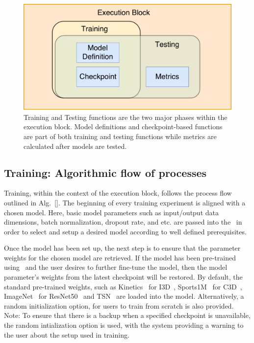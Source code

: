 \documentclass{llncs}
\begin{document}
\begin{figure}[t!]
\centering
\includegraphics[width=0.8\columnwidth]{images/exec_block.pdf}
\caption{Training and Testing functions are the two major phases within the execution block. Model definitions and checkpoint-based functions are part of both training and testing functions while metrics are calculated after models are tested.}
\label{fig:exec_block}
\end{figure}

\subsection{Training: Algorithmic flow of processes}
\label{sec:training}
Training, within the context of the execution block, follows the process flow outlined in Alg.~\ref{}.
The beginning of every training experiment is aligned with a chosen model. 
Here, basic model parameters such as input/output data dimensions, batch normalization, dropout rate, and etc. are passed into the \model~in order to select and setup a desired model according to well defined prerequisites.

Once the model has been set up, the next step is to ensure that the parameter weights for the chosen model are retrieved. 
If the model has been pre-trained using \acro~and the user desires to further fine-tune the model, then the model parameter's weights from the latest checkpoint will be restored.
By default, the standard pre-trained weights, such as Kinetics~\cite{} for I3D~\cite{}, Sports1M~\cite{} for C3D~\cite{}, ImageNet~\cite{} for ResNet50~\cite{} and TSN~\cite{} are loaded into the model.
Alternatively, a random initialization option, for users to train from scratch is also provided. \\
Note: To ensure that there is a backup when a specified checkpoint is unavailable, the random intialization option is used, with the system providing a warning to the user about the setup used in training.
\end{document}
